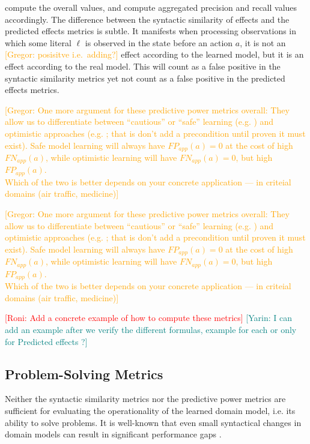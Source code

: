 \documentclass{article}
\theoremstyle{definition}
\theoremstyle{remark}
\newcommand{\roni}[1]{{\textcolor{red}{[Roni: #1]}}}
\newcommand{\mauro}[1]{{\textcolor{green}{[Mauro: #1]}}}
\newcommand{\yarin}[1]{{\textcolor{teal}{[Yarin: #1]}}}
\newcommand{\gregor}[1]{{\textcolor{orange}{[Gregor: #1]}}}
\begin{document}
compute the overall values, and compute aggregated precision and recall values accordingly.  
The difference between the syntactic similarity of effects and the predicted effects metrics is subtle. 
It manifests when processing observations in which some literal $\ell$ is observed in the state before an action $a$, 
it is not an \gregor{posisitve i.e.\ adding?} effect according to the learned model, but it is an effect according to the real model. 
This will count as a false positive in the syntactic similarity metrics yet not count as a false positive in the predicted effects metrics.

\gregor{One more argument for these predictive power metrics overall: They allow us to differentiate between ``cautious'' or ``safe'' learning (e.g. \cite{juba2021safe}) and optimistic approaches (e.g. \cite{Bachor24learning}; that is don't add a precondition until proven it must exist). Safe model learning will always have $FP_{app}(a) = 0$ at the cost of high $FN_{app}(a)$, while optimistic learning will have $FN_{app}(a) = 0$, but high $FP_{app}(a)$.\\
Which of the two is better depends on your concrete application --- in criteial domains (air traffic, medicine)}


\gregor{One more argument for these predictive power metrics overall: They allow us to differentiate between ``cautious'' or ``safe'' learning (e.g. \cite{juba2021safe}) and optimistic approaches (e.g. \cite{Bachor24learning}; that is don't add a precondition until proven it must exist). Safe model learning will always have $FP_{app}(a) = 0$ at the cost of high $FN_{app}(a)$, while optimistic learning will have $FN_{app}(a) = 0$, but high $FP_{app}(a)$.\\
Which of the two is better depends on your concrete application --- in criteial domains (air traffic, medicine)}

\roni{Add a concrete example of how to compute these metrics}
\yarin{I can add an example after we verify the different formulas, example for each or only for Predicted effects ?}

 
\subsection{Problem-Solving Metrics}
Neither the syntactic similarity metrics nor the predictive power metrics are sufficient for evaluating the operationality \citep{DBLP:conf/kcap/McCluskeyVV17} of the learned domain model, i.e. its ability to solve problems. It is well-known that even small syntactical changes in domain models can result in significant performance gaps \citep{DBLP:conf/kcap/VallatiC19,vallati2021importance}.
\end{document}
